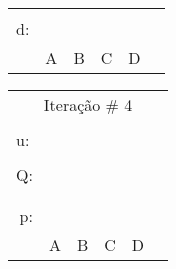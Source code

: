 \documentclass[16pt]{examdesign}
\begin{document}
\begin{fillin}[title={},
                    rearrange=no,resetcounter=no,suppressprefix]
\begin{question}
\begin{multicols}{4}
\begin{tabular}{|llllll|}
					    &                       &                       &                       &                       &  \\ \cline{2-5}
  \multicolumn{1}{|l|}{\multirow{2}{*}{d:}} & \multicolumn{1}{l|}{} & \multicolumn{1}{l|}{} & \multicolumn{1}{l|}{} & \multicolumn{1}{l|}{} &  \\
  \multicolumn{1}{|l|}{}                    & \multicolumn{1}{l|}{} & \multicolumn{1}{l|}{} & \multicolumn{1}{l|}{} & \multicolumn{1}{l|}{} &  \\ \cline{2-5}
					    & A                     & B                     & C                     & D                     &  \\ \hline
  \end{tabular}
  \begin{tabular}{|llllll|}
  \hline
  \multicolumn{6}{|c|}{Iteração \# 4}                                                                                                          \\
					    &                       &                       &                       &                       &  \\
  u:                                        &                       &                       &                       &                       &  \\ \cline{2-3}
					    &                       &                       &                       &                       &  \\ \cline{2-5}
  \multicolumn{1}{|r|}{Q:}                  & \multicolumn{1}{l|}{} & \multicolumn{1}{l|}{} & \multicolumn{1}{l|}{} & \multicolumn{1}{l|}{} &  \\
  \multicolumn{1}{|l|}{}                    & \multicolumn{1}{l|}{} & \multicolumn{1}{l|}{} & \multicolumn{1}{l|}{} & \multicolumn{1}{l|}{} &  \\ \cline{2-5}
					    &                       &                       &                       &                       &  \\ \cline{2-5}
  \multicolumn{1}{|r|}{\multirow{2}{*}{p:}} & \multicolumn{1}{l|}{} & \multicolumn{1}{l|}{} & \multicolumn{1}{l|}{} & \multicolumn{1}{l|}{} &  \\
  \multicolumn{1}{|r|}{}                    & \multicolumn{1}{l|}{} & \multicolumn{1}{l|}{} & \multicolumn{1}{l|}{} & \multicolumn{1}{l|}{} &  \\ \cline{2-5}
					    & A                     & B                     & C                     & D                     &  \\

\end{tabular}
\end{multicols}
\end{question}
\end{fillin}
\end{document}
